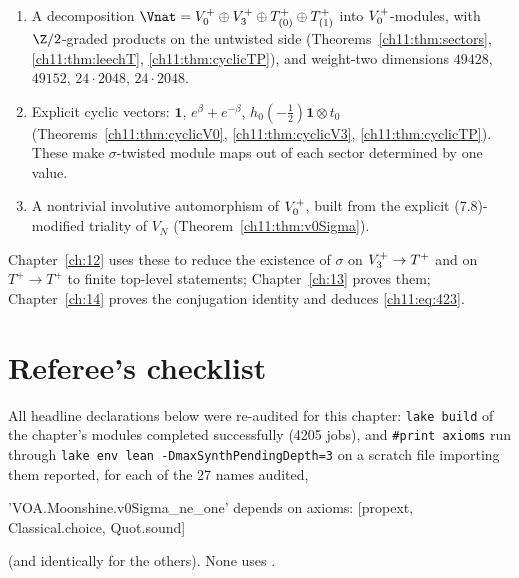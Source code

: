 \begin{enumerate}
  \item A decomposition $\Vnat=\chelVz\oplus\chelVt\oplus T^+_{(0)}\oplus T^+_{(1)}$ into
  $V_0^{+}$-modules, with $\Z/2$-graded products on the untwisted side
  (Theorems~\ref{ch11:thm:sectors}, \ref{ch11:thm:leechT}, \ref{ch11:thm:cyclicTP}), and weight-two
  dimensions $49428$, $49152$, $24\cdot2048$, $24\cdot2048$.
  \item Explicit cyclic vectors: $\mathbf 1$, $e^\beta+e^{-\beta}$, $h_0(-\tfrac12)\mathbf 1\otimes t_0$
  (Theorems~\ref{ch11:thm:cyclicV0}, \ref{ch11:thm:cyclicV3}, \ref{ch11:thm:cyclicTP}).  These make
  $\sigma$-twisted module maps out of each sector determined by one value.
  \item A nontrivial involutive automorphism  of $V_0^{+}$, built from the explicit
  (7.8)-modified triality of $V_N$ (Theorem~\ref{ch11:thm:v0Sigma}).
\end{enumerate}
Chapter~\ref{ch:12} uses these to reduce the existence of $\sigma$ on $V_3^{+}\to T^+$ and on $T^+\to T^+$
to finite top-level statements; Chapter~\ref{ch:13} proves them; Chapter~\ref{ch:14} proves the
conjugation identity and deduces \eqref{ch11:eq:423}.

\section{Referee's checklist}\label{ch11:sec:checklist}

All headline declarations below were re-audited for this chapter: \texttt{lake build} of the chapter's
modules completed successfully (4205 jobs), and \texttt{\#print axioms} run through \texttt{lake env lean
-DmaxSynthPendingDepth=3} on a scratch file importing them reported, for each of the 27 names
audited,
\begin{plaincode}
'VOA.Moonshine.v0Sigma_ne_one' depends on axioms: [propext, Classical.choice, Quot.sound]
\end{plaincode}
(and identically for the others).  None uses .

